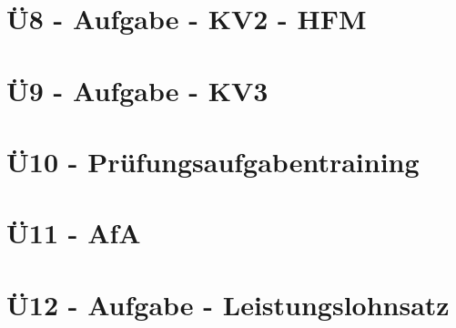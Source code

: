 \section{Ü8 - Aufgabe - KV2 - HFM}\label{sec:U08-Aufgabe-KV2-HFM}



\section{Ü9 - Aufgabe - KV3}\label{sec:U09-Aufgabe-KV3}



\section{Ü10 - Prüfungsaufgabentraining}\label{sec:U10-Pruefungsaufgabentraining}


 \newpage

\section{Ü11 - AfA}
 \newpage

\section{Ü12 - Aufgabe - Leistungslohnsatz}\label{sec:U12-Aufgabe-Leistungslohnsatz}

 \newpage

